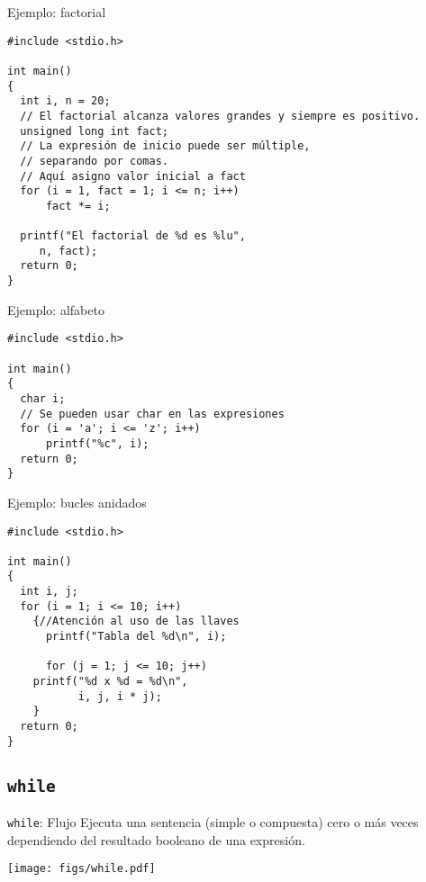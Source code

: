 \documentclass[xcolor={usenames,svgnames,dvipsnames}, aspectratio=169]{beamer}
\begin{document}
\begin{frame}[label={sec:org84fdd24},fragile]{Ejemplo: factorial}
 \lstset{language=C,label= ,caption= ,captionpos=b,numbers=none}
\begin{lstlisting}
#include <stdio.h>

int main()
{
  int i, n = 20;
  // El factorial alcanza valores grandes y siempre es positivo.
  unsigned long int fact;
  // La expresión de inicio puede ser múltiple,
  // separando por comas.
  // Aquí asigno valor inicial a fact
  for (i = 1, fact = 1; i <= n; i++)
      fact *= i;

  printf("El factorial de %d es %lu", 
	 n, fact);
  return 0;
}
\end{lstlisting}
\end{frame}


\begin{frame}[label={sec:orgdd3bbb5},fragile]{Ejemplo: alfabeto}
 \lstset{language=C,label= ,caption= ,captionpos=b,numbers=none}
\begin{lstlisting}
#include <stdio.h>

int main()
{
  char i;
  // Se pueden usar char en las expresiones 
  for (i = 'a'; i <= 'z'; i++)
      printf("%c", i);
  return 0;
}
\end{lstlisting}
\end{frame}


\begin{frame}[label={sec:orgc950547},fragile]{Ejemplo: bucles anidados}
 \lstset{language=C,label= ,caption= ,captionpos=b,numbers=none}
\begin{lstlisting}
#include <stdio.h>

int main()
{
  int i, j;
  for (i = 1; i <= 10; i++)
    {//Atención al uso de las llaves
      printf("Tabla del %d\n", i);

      for (j = 1; j <= 10; j++)
	printf("%d x %d = %d\n",
	       i, j, i * j);
    }
  return 0;
}
\end{lstlisting}
\end{frame}

\subsection{\texttt{while}}
\label{sec:orgdcfb5ad}

\begin{frame}[label={sec:org5eca7c4},fragile]{\texttt{while}: Flujo}
 Ejecuta una sentencia (simple o compuesta) \alert{cero o más veces} dependiendo del resultado booleano de una expresión.

\begin{center}
\texttt{[image: figs/while.pdf]}
\end{center}
\end{frame}
\end{document}
